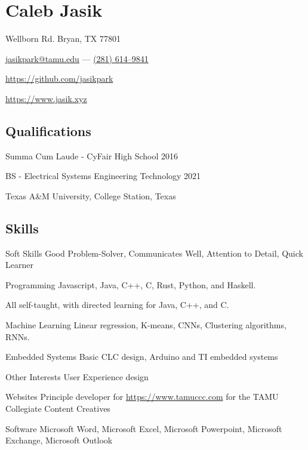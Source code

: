 \documentclass[letterpaper,10pt]{article}
\begin{document}
    \section{\Huge Caleb Jasik}\label{sec:hugecaleb-jasik}

    \hfill Wellborn Rd. Bryan, TX 77801

    \hfill \href{mailto:jasikpark@tamu.edu}{jasikpark@tamu.edu} ---
    \href{tel:2816149841}{(281) 614--9841}

    \hfill \href{https://github.com/jasikpark}{https://github.com/jasikpark}

    \hfill \href{https://jasik.xyz}{https://www.jasik.xyz}

    \subsection{Qualifications}\label{subsec:qualifications}

    Summa Cum Laude - CyFair High School 2016

    BS - Electrical Systems Engineering Technology 2021

    Texas A\&M University, College Station, Texas


    \subsection{Skills}\label{subsec:skills}

    \begin{skills}
        \item[Soft Skills]
        Good Problem-Solver, Communicates Well, Attention to Detail, Quick Learner
        \item[Programming]
        Javascript, Java, C++, C, Rust, Python, and Haskell.

        All self-taught, with directed learning for Java, C++, and C\@.
        \item[Machine Learning]
        Linear regression, K-means, CNNs, Clustering algorithms, RNNs.
        \item[Embedded Systems]
        Basic CLC design, Arduino and TI embedded systems
        \item[Other Interests]
        User Experience design
        \item[Websites]
        Principle developer for \href{https://www.tamuccc.com}{https://www.tamuccc.com} for the TAMU Collegiate Content Creatives
        \item[Software]
        Microsoft Word, Microsoft Excel, Microsoft Powerpoint, Microsoft Exchange, Microsoft Outlook
    \end{skills}
\end{document}
